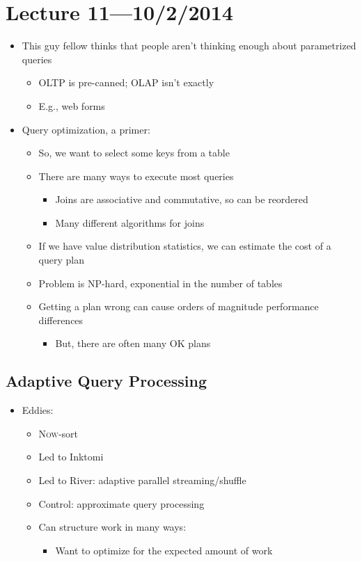 \documentclass[10pt]{article}
\begin{document}
\section{Lecture 11---10/2/2014}

\begin{itemize}
\item This guy fellow thinks that people aren't thinking enough about parametrized queries
\begin{itemize}
\item OLTP is pre-canned; OLAP isn't exactly
\item E.g., web forms
\end{itemize}
\item Query optimization, a primer:
\begin{itemize}
\item So, we want to select some keys from a table
\item There are many ways to execute most queries
\begin{itemize}
\item Joins are associative and commutative, so can be reordered
\item Many different algorithms for joins
\end{itemize}
\item If we have value distribution statistics, we can estimate the cost of a query plan
\item Problem is NP-hard, exponential in the number of tables
\item Getting a plan wrong can cause orders of magnitude performance differences
\begin{itemize}
\item But, there are often many OK plans
\end{itemize}
\end{itemize}
\end{itemize}

\subsection{Adaptive Query Processing}

\begin{itemize}
\item Eddies:
\begin{itemize}
\item \textsc{Now}-sort
\item Led to Inktomi
\item Led to River: adaptive parallel streaming/shuffle
\item Control: approximate query processing
\item Can structure work in many ways:
\begin{itemize}
\item Want to optimize for the expected amount of work
\end{itemize}
\end{itemize}
\end{itemize}
\end{document}
